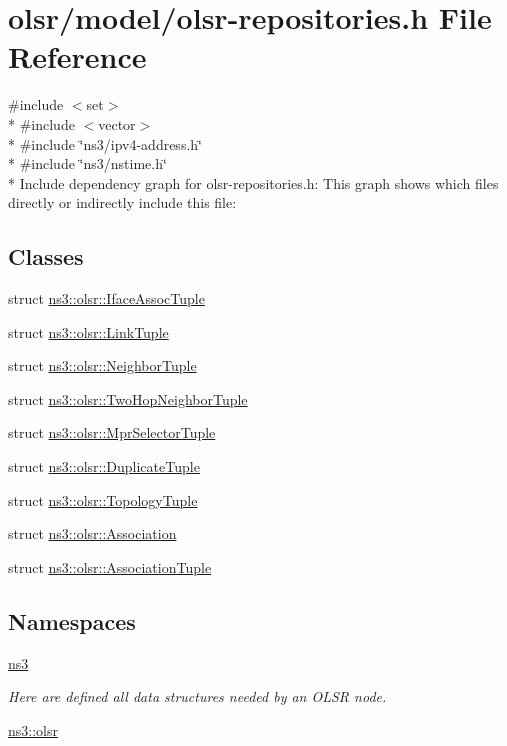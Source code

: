 \hypertarget{olsr-repositories_8h}{}\section{olsr/model/olsr-\/repositories.h File Reference}
\label{olsr-repositories_8h}
{\ttfamily \#include $<$set$>$}\\*
{\ttfamily \#include $<$vector$>$}\\*
{\ttfamily \#include \char`\"{}ns3/ipv4-\/address.\+h\char`\"{}}\\*
{\ttfamily \#include \char`\"{}ns3/nstime.\+h\char`\"{}}\\*
Include dependency graph for olsr-\/repositories.h\+:
This graph shows which files directly or indirectly include this file\+:
\subsection*{Classes}
\begin{DoxyCompactItemize}
\item 
struct \hyperlink{structns3_1_1olsr_1_1IfaceAssocTuple}{ns3\+::olsr\+::\+Iface\+Assoc\+Tuple}
\item 
struct \hyperlink{structns3_1_1olsr_1_1LinkTuple}{ns3\+::olsr\+::\+Link\+Tuple}
\item 
struct \hyperlink{structns3_1_1olsr_1_1NeighborTuple}{ns3\+::olsr\+::\+Neighbor\+Tuple}
\item 
struct \hyperlink{structns3_1_1olsr_1_1TwoHopNeighborTuple}{ns3\+::olsr\+::\+Two\+Hop\+Neighbor\+Tuple}
\item 
struct \hyperlink{structns3_1_1olsr_1_1MprSelectorTuple}{ns3\+::olsr\+::\+Mpr\+Selector\+Tuple}
\item 
struct \hyperlink{structns3_1_1olsr_1_1DuplicateTuple}{ns3\+::olsr\+::\+Duplicate\+Tuple}
\item 
struct \hyperlink{structns3_1_1olsr_1_1TopologyTuple}{ns3\+::olsr\+::\+Topology\+Tuple}
\item 
struct \hyperlink{structns3_1_1olsr_1_1Association}{ns3\+::olsr\+::\+Association}
\item 
struct \hyperlink{structns3_1_1olsr_1_1AssociationTuple}{ns3\+::olsr\+::\+Association\+Tuple}
\end{DoxyCompactItemize}
\subsection*{Namespaces}
\begin{DoxyCompactItemize}
\item 
 \hyperlink{namespacens3}{ns3}
\begin{DoxyCompactList}\small\item\em Here are defined all data structures needed by an O\+L\+SR node. \end{DoxyCompactList}\item 
 \hyperlink{namespacens3_1_1olsr}{ns3\+::olsr}
\end{DoxyCompactItemize}
